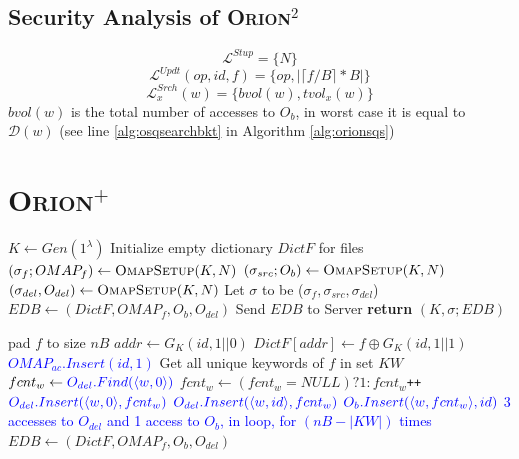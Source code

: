 \documentclass[sigconf]{acmart}
\newcommand{\pair}[2]{{\langle \ensuremath{#1, #2} \rangle}}
\newcommand{\DB}[1]{\mathcal{D}(#1)}
\newcommand{\vol}[1]{\lvert{#1}\rvert}
\newcommand{\ceil}[1]{\lceil #1 \rceil}
\newcommand{\Orionsq}{\textsc{Orion}$^{2}$ }
\newcommand{\Orionp}{\textsc{Orion}$^{+}$ }
\newcommand{\tblue}[1]{\textcolor{blue}{#1}}
\begin{document}
\subsection{Security Analysis of \Orionsq}
$$\mathcal{L}^{Stup} = \{N\}$$
$$\mathcal{L}^{Updt}(op,id,f) = \{op,\vol{\ceil{f/B}*B}\}$$
$$\mathcal{L}_x^{Srch}(w) = \{bvol(w),tvol_x(w)\}$$
$bvol(w)$ is the total number of accesses to $O_{b}$, in worst case it is equal to $\DB{w}$ (see line \ref{alg:osqsearchbkt} in Algorithm \ref{alg:orionsqs})

\section{\Orionp}


\begin{algorithm}
\caption{\Orionp $(K,\sigma;EDB)\leftarrow Setup(\lambda,N)$}\label{alg:orionpsetup}
\begin{algorithmic}[1]
\State $K \gets Gen(1^{\lambda})$
\State Initialize empty dictionary $DictF$ for files
\State $(\sigma_{f};OMAP_{f})\gets \textsc{OmapSetup}(K,N)$ 
\State $(\sigma_{src};O_{b})\gets \textsc{OmapSetup}(K,N)$ 
\State $(\sigma_{del},O_{del}) \gets \textsc{OmapSetup}(K,N)$
\State Let $\sigma$ to be ($\sigma_{f}, \sigma_{src},\sigma_{del}$) \label{opsetalgo:sigma}
\State $EDB \gets (DictF, OMAP_f, O_{b}, O_{del})$
\State Send $EDB$ to Server
\State \textbf{return} $(K,\sigma; EDB)$
\end{algorithmic}
\end{algorithm}
\label{Algo:Orion+Setup}






\begin{algorithm}
\caption{\Orionp $(K,\sigma; EDB)\leftarrow Insert(K,\sigma,(id,f);EDB)$}\label{alg:orionpinsert}
\begin{algorithmic}[1]
\State pad $f$ to size $nB$   \label{opinsalgo:pad}
\State $addr \gets G_K(id,1||0)$
  \State $DictF[addr] \gets f \oplus G_K(id,1||1)$
  \label{opinsalgo:insblocks}
  \State \tblue{$OMAP_{ac}.Insert(id,1)$}
\State Get all unique keywords of $f$ in set $KW$ 
  \label{opinsalgo:forloopstart}
    \State $fcnt_w \gets\tblue{ O_{del}.Find(\pair{w}{0})}$ \label{opinsalgo:getfcnt}
    \State $fcnt_w\gets(fcnt_w=NULL)?1:fcnt_w$\texttt{++} \label{opinsalgo:fcntinc}
    \State $\tblue{O_{del}.Insert(\pair{w}{0},fcnt_w)}$\label{opinsalgo:setfcnt} \label{opinsalgo:fcntupdt}
    \State $\tblue{O_{del}.Insert(\pair{w}{id},fcnt_w)}$\label{opinsalgo:fcntidupdt}
   \State $\tblue{O_{b}.Insert(\pair{w}{fcnt_w},id)}$\label{opinsalgo:updtidblock}
\EndFor \label{opinsalgo:forloopend}
\State \tblue{3 accesses to $O_{del}$ and 1 access to $O_{b}$, in loop, for $(nB-\vol{KW})$ times} \label{opinsalgo:fake}
\State $EDB \gets (DictF,OMAP_{f},O_{b},O_{del})$
\end{algorithmic}
\end{algorithm}
\label{Algo:Orion+insert}
\end{document}
